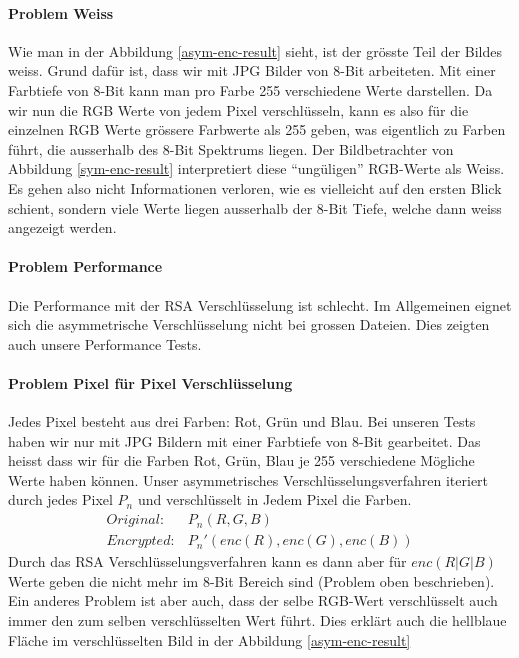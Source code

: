 \documentclass[paper=a4,fontsize=12pt]{scrartcl}
\begin{document}
\paragraph{Problem Weiss} \label{problem-white}
Wie man in der Abbildung \ref{asym-enc-result} sieht, ist der grösste Teil
der Bildes weiss.
Grund dafür ist, dass wir mit JPG Bilder von 8-Bit arbeiteten.
Mit einer Farbtiefe von 8-Bit kann man pro Farbe 255 verschiedene Werte darstellen.
Da wir nun die RGB Werte von jedem Pixel verschlüsseln, kann es also für die einzelnen
RGB Werte grössere Farbwerte als 255 geben, was eigentlich zu Farben führt,
die ausserhalb des 8-Bit Spektrums liegen.
Der Bildbetrachter von Abbildung \ref{sym-enc-result} interpretiert diese "`ungüligen"'
RGB-Werte als Weiss. 
Es gehen also nicht Informationen verloren, wie es vielleicht auf den ersten Blick schient,
sondern viele Werte liegen ausserhalb der 8-Bit Tiefe, welche dann weiss angezeigt werden.

\paragraph{Problem Performance} Die Performance mit der RSA Verschlüsselung ist schlecht.
Im Allgemeinen eignet sich die asymmetrische Verschlüsselung nicht bei grossen Dateien.
Dies zeigten auch unsere Performance Tests.

\paragraph{Problem Pixel für Pixel Verschlüsselung} 
Jedes Pixel besteht aus drei Farben: Rot, Grün und Blau.
Bei unseren Tests haben wir nur mit JPG Bildern mit einer Farbtiefe von 8-Bit gearbeitet.
Das heisst dass wir für die Farben Rot, Grün, Blau je 255 verschiedene Mögliche Werte haben können.
Unser asymmetrisches Verschlüsselungsverfahren iteriert durch jedes Pixel $P_n$ und verschlüsselt
in Jedem Pixel die Farben.
\begin{align}
Original: &P_n(R,G,B) \\
Encrypted: &P_n'(enc(R), enc(G), enc(B))
\end{align}
Durch das RSA Verschlüsselungsverfahren kann es dann aber für $enc(R|G|B)$ Werte geben die nicht mehr
im 8-Bit Bereich sind (Problem oben beschrieben).
Ein anderes Problem ist aber auch, dass der selbe RGB-Wert verschlüsselt auch immer den zum selben
verschlüsselten Wert führt. Dies erklärt auch die hellblaue Fläche im verschlüsselten Bild 
in der Abbildung \ref{asym-enc-result}
\end{document}
